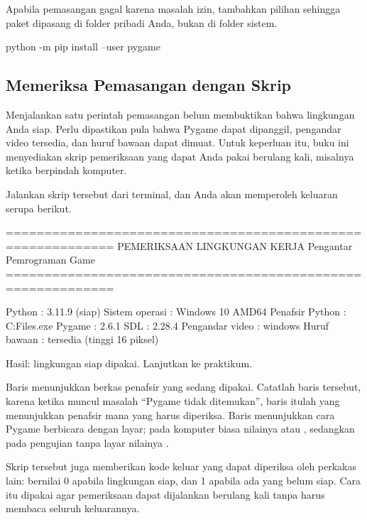 Apabila pemasangan gagal karena masalah izin, tambahkan pilihan
 sehingga paket dipasang di folder pribadi Anda, bukan di
folder sistem.

\begin{kodekeluaran}
python -m pip install --user pygame
\end{kodekeluaran}

\subsection{Memeriksa Pemasangan dengan Skrip}

Menjalankan satu perintah pemasangan belum membuktikan bahwa lingkungan Anda
siap. Perlu dipastikan pula bahwa Pygame dapat dipanggil, pengandar video
tersedia, dan huruf bawaan dapat dimuat. Untuk keperluan itu, buku ini
menyediakan skrip pemeriksaan yang dapat Anda pakai berulang kali, misalnya
ketika berpindah komputer.


Jalankan skrip tersebut dari terminal, dan Anda akan memperoleh keluaran
serupa berikut.

\begin{kodekeluaran}
============================================================
 PEMERIKSAAN LINGKUNGAN KERJA
 Pengantar Pemrograman Game
============================================================

Python           : 3.11.9 (siap)
Sistem operasi   : Windows 10 AMD64
Penafsir Python  : C:\Program Files\python.exe
Pygame           : 2.6.1
SDL              : 2.28.4
Pengandar video  : windows
Huruf bawaan     : tersedia (tinggi 16 piksel)

Hasil: lingkungan siap dipakai. Lanjutkan ke praktikum.
\end{kodekeluaran}

Baris  menunjukkan berkas penafsir yang sedang dipakai.
Catatlah baris tersebut, karena ketika muncul masalah ``Pygame tidak
ditemukan'', baris itulah yang menunjukkan penafsir mana yang harus
diperiksa. Baris  menunjukkan cara Pygame berbicara
dengan layar; pada komputer biasa nilainya  atau ,
sedangkan pada pengujian tanpa layar nilainya .

Skrip tersebut juga memberikan kode keluar yang dapat diperiksa oleh perkakas
lain: bernilai 0 apabila lingkungan siap, dan 1 apabila ada yang belum siap.
Cara itu dipakai agar pemeriksaan dapat dijalankan berulang kali tanpa harus
membaca seluruh keluarannya.

